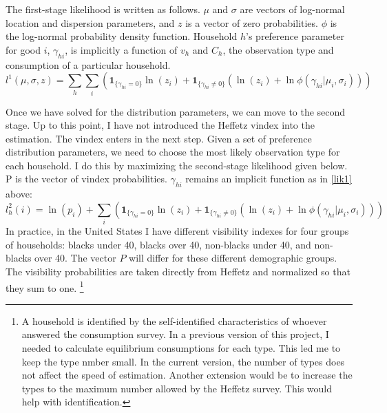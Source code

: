 \documentclass[12pt]{article}
\begin{document}
The first-stage likelihood is written as follows. $\mu$ and $\sigma$ are vectors of log-normal location and dispersion parameters, and $z$ is a vector of zero probabilities. $\phi$ is the log-normal probability density function. Household $h$'s preference parameter for good $i$, $\gamma_{hi}$, is implicitly a function of $v_h$ and $C_{h}$, the observation type and consumption of a particular household. 
\begin{equation}
	\label{lik1}
	l^1(\mu,\sigma,z) = \sum_{h} \sum_{i} \left(\mathbf{1}_{\{\gamma_{hi} = 0\}}\ln\left(z_i\right) + \mathbf{1}_{\{\gamma_{hi} \neq 0\}} \left(\ln\left(z_i\right)+\ln \phi(\gamma_{hi}|\mu_i,\sigma_i)\right)\right)
\end{equation}

Once we have solved for the distribution parameters, we can move to the second stage. 
Up to this point, I have not introduced the Heffetz vindex into the estimation. The vindex enters in the next step.
Given a set of preference distribution parameters, we need to choose the most likely observation type for each household. I do this by maximizing the second-stage likelihood given below.
P is the vector of vindex probabilities.  $\gamma_{hi}$ remains an implicit function as in \eqref{lik1} above:
\begin{equation}
    \label{lik2}
    l_h^2(i) = \ln(p_i) + \sum_{i} \left(\mathbf{1}_{\{\gamma_{hi} = 0\}}\ln\left(z_i\right) + \mathbf{1}_{\{\gamma_{hi} \neq 0\}} \left(\ln\left(z_i\right)+\ln \phi(\gamma_{hi}|\mu_i,\sigma_i)\right)\right)
\end{equation}
In practice, in the United States I have different visibility indexes for four groups of households: blacks under 40, blacks over 40, non-blacks under 40, and non-blacks over 40.
The vector $P$ will differ for these different demographic groups.
The visibility probabilities are taken directly from Heffetz and normalized so that they sum to one.
\footnote{A household is identified by the self-identified characteristics of whoever answered the consumption survey. 
In a previous version of this project, I needed to calculate equilibrium consumptions for each type.  This led me to keep the type nmber small.  In the current version, the number of types does not affect the speed of estimation.  Another extension would be to increase the types to the maximum number allowed by the Heffetz survey. This would help with identification.}
\end{document}
